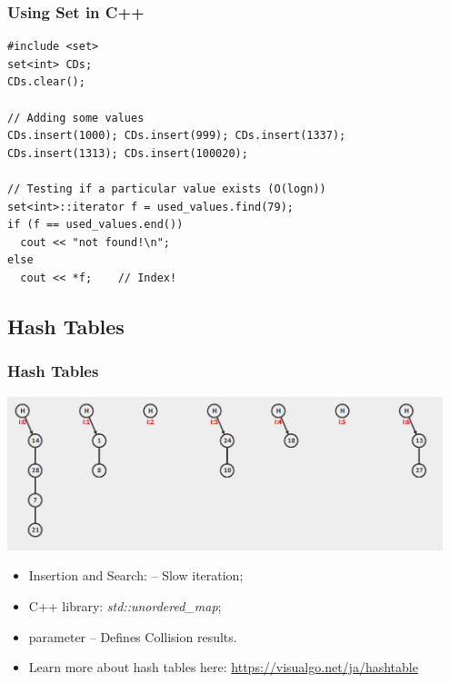 \begin{frame}[fragile]
  \frametitle{Using Set in C++}
  {\small
\begin{verbatim}
#include <set>
set<int> CDs;
CDs.clear();

// Adding some values
CDs.insert(1000); CDs.insert(999); CDs.insert(1337);
CDs.insert(1313); CDs.insert(100020);

// Testing if a particular value exists (O(logn))
set<int>::iterator f = used_values.find(79);
if (f == used_values.end())
  cout << "not found!\n";
else
  cout << *f;    // Index!
\end{verbatim}}
\end{frame}

\subsection{Hash Tables}
\begin{frame}[fragile]
  \frametitle{Hash Tables}

  \includegraphics[width=0.95\textwidth]{img/hash}

  \begin{itemize}
  \item Insertion and Search:  -- \alert{Slow iteration};
  \item C++ library: \emph{std::unordered\_map};
  \item {} parameter -- Defines Collision results.
  \item Learn more about hash tables here: \url{https://visualgo.net/ja/hashtable}
  \end{itemize}
\end{frame}
